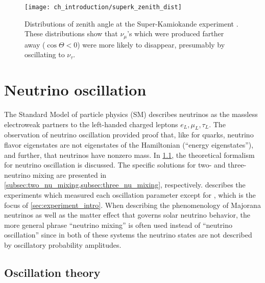 \begin{figure}
    \centering
    \texttt{[image: ch\_introduction/superk\_zenith\_dist]}
    \caption[Super-Kamiokande zenith angle distribution]{
        Distributions of zenith angle at the Super-Kamiokande experiment
        \cite{superk1998}.
        These distributions show that $\nu_\mu$'s which were produced farther away
        ($\cos\Theta < 0$)
        were more likely to disappear, presumably by oscillating to $\nu_\tau$.
    }
    \label{fig:superk_zenith}
\end{figure}


\section{Neutrino oscillation}
\label{sec:osc_intro}

The Standard Model of particle physics (SM)
describes neutrinos as the massless electroweak partners
to the left-handed charged leptons $e_L,\mu_L,\tau_L$.
The observation of neutrino oscillation provided proof that,
like for quarks, neutrino flavor eigenstates are not
eigenstates of the Hamiltonian (``energy eigenstates''),
and further, that neutrinos have nonzero mass.
In \cref{subsec:theory}, the theoretical formalism for neutrino oscillation is discussed.
The specific solutions for two- and three-neutrino mixing
are presented in \cref{subsec:two_nu_mixing,subsec:three_nu_mixing},
respectively.
 describes the experiments which measured
each oscillation parameter
except for \thetaot{}, which is the focus of \cref{sec:experiment_intro}.
When describing the phenomenology of Majorana neutrinos
as well as the matter effect that governs solar neutrino behavior,
the more general phrase ``neutrino mixing''
is often used instead of ``neutrino oscillation''
since in both of these systems
the neutrino states are not described by oscillatory probability amplitudes.

\subsection{Oscillation theory}
\label{subsec:theory}

